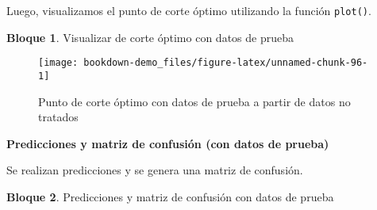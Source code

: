\documentclass[
]{book}
\newenvironment{Shaded}{\begin{snugshade}}{\end{snugshade}}
\newcommand{\AttributeTok}[1]{\textcolor[rgb]{0.77,0.63,0.00}{#1}}
\newcommand{\ConstantTok}[1]{\textcolor[rgb]{0.00,0.00,0.00}{#1}}
\newcommand{\DecValTok}[1]{\textcolor[rgb]{0.00,0.00,0.81}{#1}}
\newcommand{\FloatTok}[1]{\textcolor[rgb]{0.00,0.00,0.81}{#1}}
\newcommand{\FunctionTok}[1]{\textcolor[rgb]{0.00,0.00,0.00}{#1}}
\newcommand{\NormalTok}[1]{#1}
\newcommand{\OtherTok}[1]{\textcolor[rgb]{0.56,0.35,0.01}{#1}}
\newcommand{\SpecialCharTok}[1]{\textcolor[rgb]{0.00,0.00,0.00}{#1}}
\newcommand{\StringTok}[1]{\textcolor[rgb]{0.31,0.60,0.02}{#1}}
\theoremstyle{definition}
\theoremstyle{definition}
\newtheorem{example}{Bloque}[chapter]
\theoremstyle{definition}
\theoremstyle{definition}
\theoremstyle{remark}
\begin{document}
Luego, visualizamos el punto de corte óptimo utilizando la función \texttt{plot()}.

\begin{example}
\protect\hypertarget{exm:bloque23nbm}{}\label{exm:bloque23nbm}Visualizar de corte óptimo con datos de prueba
\end{example}

\begin{Shaded}
\end{Shaded}

\begin{figure}
\texttt{[image: bookdown-demo\_files/figure-latex/unnamed-chunk-96-1]} \caption{Punto de corte óptimo con datos de prueba a partir de datos no tratados}\label{fig:unnamed-chunk-96}
\end{figure}

\textbf{Predicciones y matriz de confusión (con datos de prueba)}

Se realizan predicciones y se genera una matriz de confusión.

\begin{example}
\protect\hypertarget{exm:bloque24nbm}{}\label{exm:bloque24nbm}Predicciones y matriz de confusión con datos de prueba
\end{example}

\begin{Shaded}
\end{Shaded}
\end{document}
